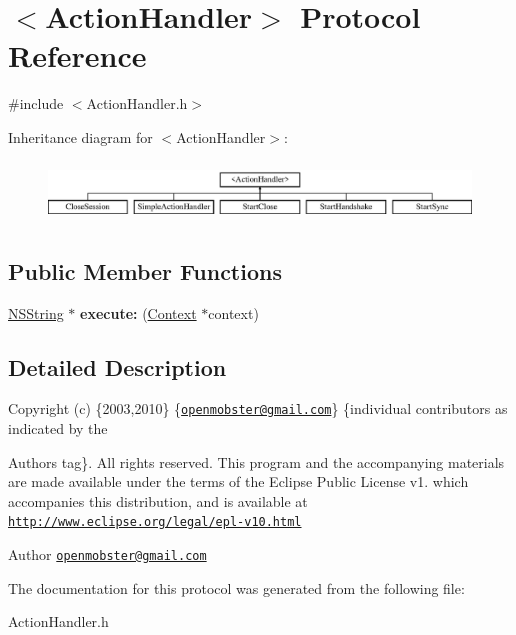 \hypertarget{protocol_action_handler-p}{
\section{$<$\-Action\-Handler$>$ \-Protocol \-Reference}
\label{protocol_action_handler-p}
}


{\ttfamily \#include $<$\-Action\-Handler.\-h$>$}

\-Inheritance diagram for $<$\-Action\-Handler$>$\-:\begin{figure}[H]
\begin{center}
\leavevmode
\includegraphics[height=1.623188cm]{protocol_action_handler-p}
\end{center}
\end{figure}
\subsection*{\-Public \-Member \-Functions}
\begin{DoxyCompactItemize}
\item 
\hypertarget{protocol_action_handler-p_a9480251a45c8bf8973bbd34f873c443f}{
\hyperlink{class_n_s_string}{\-N\-S\-String} $\ast$ {\bfseries execute\-:} (\hyperlink{interface_context}{\-Context} $\ast$context)}
\label{protocol_action_handler-p_a9480251a45c8bf8973bbd34f873c443f}

\end{DoxyCompactItemize}


\subsection{\-Detailed \-Description}
\-Copyright (c) \{2003,2010\} \{\href{mailto:openmobster@gmail.com}{\tt openmobster@gmail.\-com}\} \{individual contributors as indicated by the \begin{DoxyAuthor}{\-Authors}
tag\}. \-All rights reserved. \-This program and the accompanying materials are made available under the terms of the \-Eclipse \-Public \-License v1. which accompanies this distribution, and is available at \href{http://www.eclipse.org/legal/epl-v10.html}{\tt http\-://www.\-eclipse.\-org/legal/epl-\/v10.\-html}
\end{DoxyAuthor}
\begin{DoxyAuthor}{\-Author}
\href{mailto:openmobster@gmail.com}{\tt openmobster@gmail.\-com} 
\end{DoxyAuthor}


\-The documentation for this protocol was generated from the following file\-:\begin{DoxyCompactItemize}
\item 
\-Action\-Handler.\-h\end{DoxyCompactItemize}
